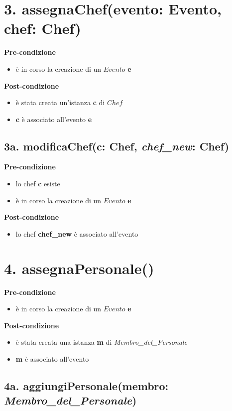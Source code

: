 \documentclass[12pt]{extarticle}
\begin{document}
\section*{3. assegnaChef(evento: Evento, chef: Chef)}

\textbf{Pre-condizione}
\begin{itemize}
  \item è in corso la creazione di un $Evento$ \textbf{e}
\end{itemize}
\textbf{Post-condizione}
\begin{itemize}
  \item è stata creata un'istanza \textbf{c} di  $Chef$
  \item \textbf{c} è associato all'evento \textbf{e}
\end{itemize}


\subsection*{3a. modificaChef(c: Chef, \textit{chef\_new}: Chef)}

\textbf{Pre-condizione}
\begin{itemize}
  \item lo chef \textbf{c} esiste
  \item è in corso la creazione di un $Evento$ \textbf{e}
\end{itemize}
\textbf{Post-condizione}
\begin{itemize}
  \item lo chef \textbf{chef\_new} è associato all'evento
\end{itemize}


\section*{4. assegnaPersonale()}

\textbf{Pre-condizione}
\begin{itemize}
  \item è in corso la creazione di un $Evento$ \textbf{e}
\end{itemize}
\textbf{Post-condizione}
\begin{itemize}
  \item è stata creata una istanza \textbf{m} di \textit{Membro\_del\_Personale}
  \item \textbf{m} è associato all'evento
\end{itemize}


\subsection*{4a. aggiungiPersonale(membro: \textit{Membro\_del\_Personale})}
\end{document}
